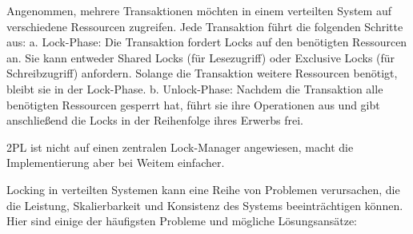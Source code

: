 Angenommen, mehrere Transaktionen möchten in einem verteilten System auf verschiedene Ressourcen zugreifen. Jede Transaktion führt die folgenden Schritte aus:
a. Lock-Phase: Die Transaktion fordert Locks auf den benötigten Ressourcen an. Sie kann entweder Shared Locks (für Lesezugriff) oder Exclusive Locks (für Schreibzugriff) anfordern. Solange die Transaktion weitere Ressourcen benötigt, bleibt sie in der Lock-Phase.
b. Unlock-Phase: Nachdem die Transaktion alle benötigten Ressourcen gesperrt hat, führt sie ihre Operationen aus und gibt anschließend die Locks in der Reihenfolge ihres Erwerbs frei.

2PL ist nicht auf einen  zentralen Lock-Manager angewiesen, macht die Implementierung aber bei Weitem einfacher. 

Locking in verteilten Systemen kann eine Reihe von Problemen verursachen, die die Leistung, Skalierbarkeit und Konsistenz des Systems beeinträchtigen können. Hier sind einige der häufigsten Probleme und mögliche Lösungsansätze:
